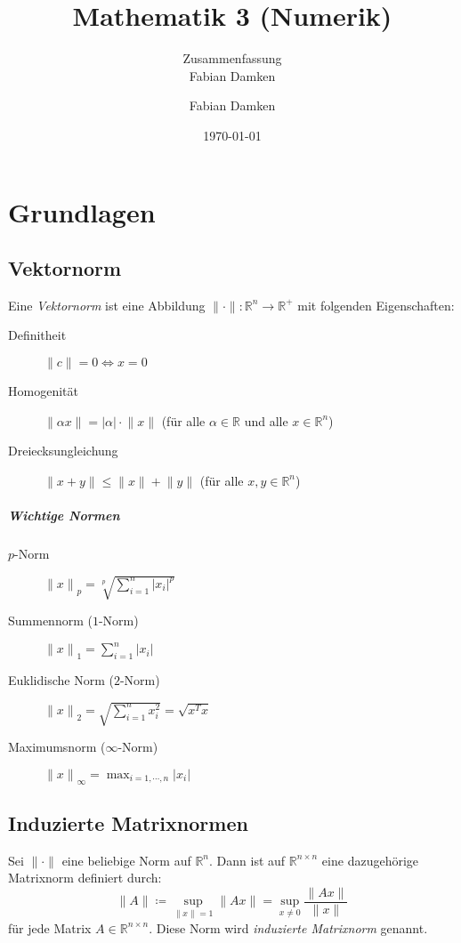\documentclass[a4paper, 11pt, accentcolor = tud3b]{tudreport}
\title{Mathematik 3 (Numerik)}
\subtitle{Zusammenfassung \\ Fabian Damken}
\author{Fabian Damken}
\date{\today}
\newcommand{\abs}[1]{\ensuremath{{\lvert #1 \rvert}}}
\newcommand{\norm}[1]{\ensuremath{\lVert #1 \rVert}}
\newcommand{\R}{\ensuremath{\mathbb{R}}}
\begin{document}
    \maketitle
    \tableofcontents
    \listoftodos

	\chapter{Grundlagen}
	    \section{Vektornorm}
	        Eine \textit{Vektornorm} ist eine Abbildung \( \norm{\cdot} : \R^n \rightarrow \R ^ + \) mit folgenden Eigenschaften:
	        \begin{description}
	        	\item[Definitheit] \( \norm{c} = 0 \iff x = 0 \)
	        	\item[Homogenität] \( \norm{\alpha x} = \abs{\alpha} \cdot \norm{x} \) (für alle \( \alpha \in \R \) und alle \( x \in \R^n \))
	        	\item[Dreiecksungleichung] \( \norm{x + y} \leq \norm{x} + \norm{y} \) (für alle \( x, y \in \R^n \))
	        \end{description}
	    
		    \paragraph{Wichtige Normen}
			    \begin{description}
			    	\item[\(p\)-Norm] \( \norm{x}_p = \sqrt[p]{\sum_{i = 1}^n \abs{x_i}^p} \)
			    	\item[Summennorm (\(1\)-Norm)] \( \norm{x}_1 = \sum_{i = 1}^n \abs{x_i} \)
			    	\item[Euklidische Norm (\(2\)-Norm)] \( \norm{x}_2 = \sqrt{\sum_{i = 1}^n x_i^2} = \sqrt{x^T x} \)
			    	\item[Maximumsnorm (\(\infty\)-Norm)] \( \norm{x}_\infty = \max_{i = 1, \cdots, n} \abs{x_i} \)
			    \end{description}
	
	    \section{Induzierte Matrixnormen}
	        Sei \( \norm{\cdot} \) eine beliebige Norm auf \(\R^n\). Dann ist auf \( \R^{n \times n} \) eine dazugehörige Matrixnorm definiert durch:
	        \begin{equation*}
		        \norm{A} \coloneqq \sup _ {\norm{x} = 1} \norm{Ax} = \sup _ {x\neq 0} \frac{\norm{Ax}}{\norm{x}}
	        \end{equation*}
	        für jede Matrix \( A \in \R^{n \times n} \). Diese Norm wird \textit{induzierte Matrixnorm} genannt.
	        
\end{document}
